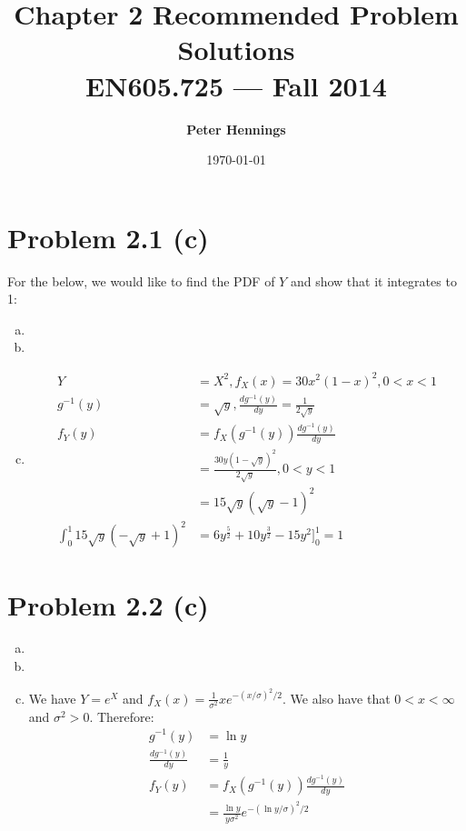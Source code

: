 \documentclass[11pt]{article}
\title{\bf Chapter 2 Recommended Problem Solutions\\[2ex] 
       \rm\normalsize EN605.725 --- Fall 2014}
\date{\today}
\author{\bf Peter Hennings}
\begin{document}
\maketitle

\section*{Problem 2.1 (c)} 

For the below, we would like to find the PDF of $Y$ and show that it integrates to 1:

\begin{enumerate}[(a)]
    \item 
    \item 
    \item 
        \begin{align*}
            Y &= X^2, f_X(x) = 30x^2(1 - x)^2, 0 < x < 1 \\
            g^{-1}(y) &= \sqrt{y}, \frac{d g^{-1}(y)}{dy} = \frac{1}{2 \sqrt{y}} \\
            f_Y(y) &= f_X(g^{-1}(y)) \frac{d g^{-1}(y)}{dy} \\
            &= \frac{30y(1 - \sqrt{y})^2}{2 \sqrt{y}}, 0 < y < 1 \\
            &= 15 \sqrt{y} (\sqrt{y}-1)^2 \\
            \int_0^1 15 \sqrt{y} (-\sqrt{y}+1)^2 &= 6 y^{\frac{5}{2}} + 10 y^{\frac{3}{2}} - 15 y^{2} \big]_0^1 = 1
        \end{align*}
\end{enumerate}

\section*{Problem 2.2 (c)}

\begin{enumerate}[(a)]
    \item 
    \item 
    \item We have $Y = e^X$ and $f_X(x) = \frac{1}{\sigma^2} x e^{-(x/\sigma)^2/2}$.  We also have that $0 < x < \infty$ and $\sigma^2 > 0$.  Therefore:
        \begin{align*}
            g^{-1}(y) &= \ln{y} \\
            \frac{d g^{-1}(y)}{dy} &= \frac{1}{y} \\
            f_Y(y) &= f_X(g^{-1}(y)) \frac{d g^{-1}(y)}{dy} \\
            &= \frac{\ln{y}}{y \sigma^2} e^{-(\ln{y}/\sigma)^2/2}
        \end{align*}
\end{enumerate}
\end{document}

